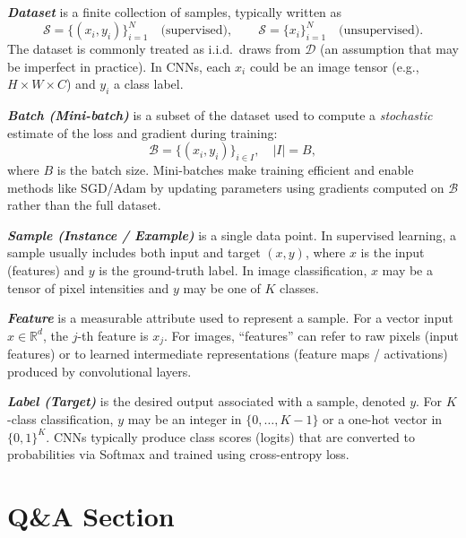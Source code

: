 \documentclass{article}
\begin{document}
\textbf{\textit{Dataset}} is a finite collection of samples, typically written as
\[
\mathcal{S}=\{(x_i,y_i)\}_{i=1}^N \quad \text{(supervised)}, \qquad
\mathcal{S}=\{x_i\}_{i=1}^N \quad \text{(unsupervised)}.
\]
The dataset is commonly treated as i.i.d.\ draws from $\mathcal{D}$ (an assumption that may be imperfect in practice). In CNNs, each $x_i$ could be an image tensor (e.g., $H\times W\times C$) and $y_i$ a class label.

\textbf{\textit{Batch (Mini-batch)}} is a subset of the dataset used to compute a \emph{stochastic} estimate of the loss and gradient during training:
\[
\mathcal{B}=\{(x_i,y_i)\}_{i\in I}, \quad |I|=B,
\]
where $B$ is the batch size. Mini-batches make training efficient and enable methods like SGD/Adam by updating parameters using gradients computed on $\mathcal{B}$ rather than the full dataset.

\textbf{\textit{Sample (Instance / Example)}} is a single data point. In supervised learning, a sample usually includes both input and target $(x,y)$, where $x$ is the input (features) and $y$ is the ground-truth label. In image classification, $x$ may be a tensor of pixel intensities and $y$ may be one of $K$ classes.

\textbf{\textit{Feature}} is a measurable attribute used to represent a sample. For a vector input $x\in\mathbb{R}^d$, the $j$-th feature is $x_j$. For images, ``features'' can refer to raw pixels (input features) or to learned intermediate representations (feature maps / activations) produced by convolutional layers.

\textbf{\textit{Label (Target)}} is the desired output associated with a sample, denoted $y$. For $K$-class classification, $y$ may be an integer in $\{0,\dots,K-1\}$ or a one-hot vector in $\{0,1\}^K$. CNNs typically produce class scores (logits) that are converted to probabilities via Softmax and trained using cross-entropy loss.

\section{Q\&A Section}
\end{document}
